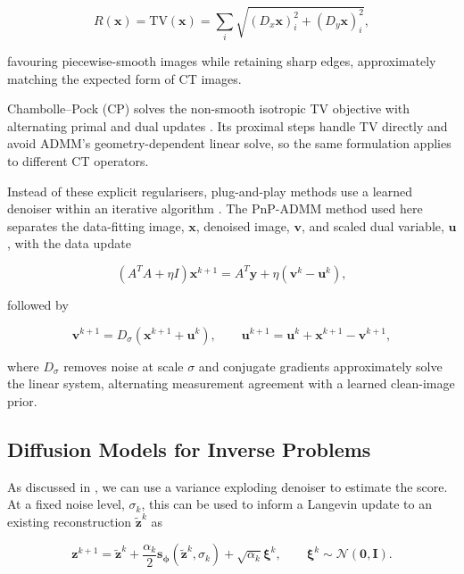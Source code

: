 \begin{equation}
R(\mathbf{x})=\mathrm{TV}(\mathbf{x})
=
\sum_i
\sqrt{
(D_x\mathbf{x})_i^2
+
(D_y\mathbf{x})_i^2
},
\label{eq:total_variation_regulariser}
\end{equation}

favouring piecewise-smooth images while retaining sharp edges, approximately matching the expected form of CT images.

Chambolle--Pock (CP) solves the non-smooth isotropic TV objective with alternating primal and dual updates \cite{}. Its proximal steps handle TV directly and avoid ADMM's geometry-dependent linear solve, so the same formulation applies to different CT operators.

Instead of these explicit regularisers, plug-and-play methods use a learned denoiser within an iterative algorithm \cite{}. The PnP-ADMM method used here separates the data-fitting image, $\mathbf{x}$, denoised image, $\mathbf{v}$, and scaled dual variable, $\mathbf{u}$, with the data update

\begin{equation}
(A^TA+\eta I)\mathbf{x}^{k+1}
=
A^T\mathbf{y}+\eta(\mathbf{v}^k-\mathbf{u}^k),
\label{eq:pnp_data_update}
\end{equation}

followed by

\begin{equation}
\mathbf{v}^{k+1}=D_\sigma(\mathbf{x}^{k+1}+\mathbf{u}^k),
\qquad
\mathbf{u}^{k+1}=\mathbf{u}^k+\mathbf{x}^{k+1}-\mathbf{v}^{k+1},
\label{eq:pnp_denoising_update}
\end{equation}

where $D_\sigma$ removes noise at scale $\sigma$ and conjugate gradients approximately solve the linear system, alternating measurement agreement with a learned clean-image prior.

\subsection{Diffusion Models for Inverse Problems}
\label{subsec:diffusion_models_inverse_problems}

As discussed in , we can use a variance exploding denoiser to estimate the score. At a fixed noise level, $\sigma_k$, this can be used to inform a Langevin update \cite{} to an existing reconstruction $\tilde{\mathbf{z}}^k$ as

\begin{equation}
\mathbf{z}^{k+1}
=
\tilde{\mathbf{z}}^k
+
\frac{\alpha_k}{2}
\mathbf{s}_{\boldsymbol{\phi}}(\tilde{\mathbf{z}}^k,\sigma_k)
+
\sqrt{\alpha_k}\boldsymbol{\xi}^k,
\qquad
\boldsymbol{\xi}^k\sim\mathcal{N}(\mathbf{0},\mathbf{I}).
\label{eq:Langevin_step}
\end{equation}

